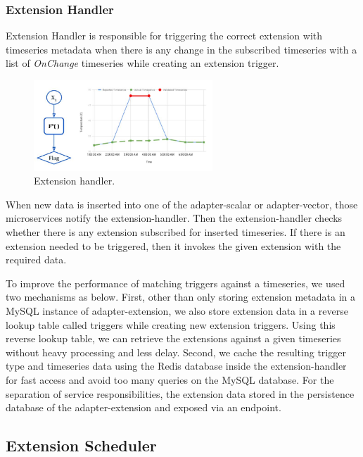 \subsubsection{Extension Handler}

Extension Handler is responsible for triggering the correct extension with timeseries metadata when there is any change in the subscribed timeseries with a list of \emph{OnChange} timeseries while creating an extension trigger.

\begin{figure}[htp]
    \centering
    \includegraphics[width=0.6\textwidth]{method/data_preprocess/validation.jpg}
    \caption{Extension handler.}
    \label{fi:extension_handler}
\end{figure}

When new data is inserted into one of the adapter-scalar or adapter-vector, those microservices notify the extension-handler. Then the extension-handler checks whether there is any extension subscribed for inserted timeseries. If there is an extension needed to be triggered, then it invokes the given extension with the required data.

To improve the performance of matching triggers against a timeseries, we used two mechanisms as below. First, other than only storing extension metadata in a MySQL instance of adapter-extension, we also store extension data in a reverse lookup table called triggers while creating new extension triggers. Using this reverse lookup table, we can retrieve the extensions against a given timeseries without heavy processing and less delay. Second, we cache the resulting trigger type and timeseries data using the Redis database inside the extension-handler for fast access and avoid too many queries on the MySQL database. For the separation of service responsibilities, the extension data stored in the persistence database of the adapter-extension and exposed via an endpoint.

\subsection{Extension Scheduler}

